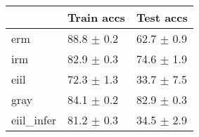\begin{tabular}{lll}
\toprule
{} &      Train accs &       Test accs \\
\midrule
erm        &  88.8 $\pm$ 0.2 &  62.7 $\pm$ 0.9 \\
irm        &  82.9 $\pm$ 0.3 &  74.6 $\pm$ 1.9 \\
eiil       &  72.3 $\pm$ 1.3 &  33.7 $\pm$ 7.5 \\
gray       &  84.1 $\pm$ 0.2 &  82.9 $\pm$ 0.3 \\
eiil_infer &  81.2 $\pm$ 0.3 &  34.5 $\pm$ 2.9 \\
\bottomrule
\end{tabular}

